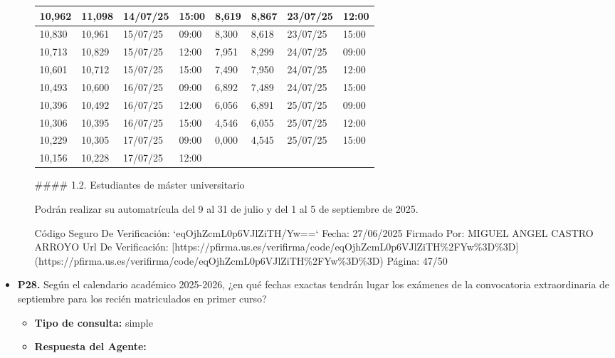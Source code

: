 \documentclass{article}
\begin{document}
\begin{itemize}
\begin{itemize}
\begin{scriptsize}
\begin{table}[h!]
\begin{tabular}{|p{}|p{}|p{}|p{}|p{}|p{}|p{}|p{}|}
                      10,962 & 11,098 & 14/07/25 & 15:00 & 8,619  & 8,867  & 23/07/25 & 12:00 \\\hline
                      10,830 & 10,961 & 15/07/25 & 09:00 & 8,300  & 8,618  & 23/07/25 & 15:00 \\\hline
                      10,713 & 10,829 & 15/07/25 & 12:00 & 7,951  & 8,299  & 24/07/25 & 09:00 \\\hline
                      10,601 & 10,712 & 15/07/25 & 15:00 & 7,490  & 7,950  & 24/07/25 & 12:00 \\\hline
                      10,493 & 10,600 & 16/07/25 & 09:00 & 6,892  & 7,489  & 24/07/25 & 15:00 \\\hline
                      10,396 & 10,492 & 16/07/25 & 12:00 & 6,056  & 6,891  & 25/07/25 & 09:00 \\\hline
                      10,306 & 10,395 & 16/07/25 & 15:00 & 4,546  & 6,055  & 25/07/25 & 12:00 \\\hline
                      10,229 & 10,305 & 17/07/25 & 09:00 & 0,000  & 4,545  & 25/07/25 & 15:00 \\\hline
                      10,156 & 10,228 & 17/07/25 & 12:00 &        &        &          &       \\\hline
                    \end{tabular}\end{table}
                  \vspace{0.4cm}

                  \#\#\#\# 1.2. Estudiantes de máster universitario

                  Podrán realizar su automatrícula del 9 al 31 de julio y del 1 al 5 de septiembre de 2025.

                  Código Seguro De Verificación: `eqOjhZcmL0p6VJlZiTH/Yw==`
                  Fecha: 27/06/2025
                  Firmado Por: MIGUEL ANGEL CASTRO ARROYO
                  Url De Verificación: [https://pfirma.us.es/verifirma/code/eqOjhZcmL0p6VJlZiTH\%2FYw\%3D\%3D](https://pfirma.us.es/verifirma/code/eqOjhZcmL0p6VJlZiTH\%2FYw\%3D\%3D)
                  Página: 47/50
                \end{scriptsize}
        \end{itemize}


  \item \textbf{P28.} Según el calendario académico 2025-2026, ¿en qué fechas exactas tendrán lugar los exámenes de la convocatoria extraordinaria de septiembre para los recién matriculados en primer curso? \\
        \begin{itemize}
          \item \textbf{Tipo de consulta:} simple
          \item \textbf{Respuesta del Agente:}


\end{itemize}
\end{itemize}
\end{document}

